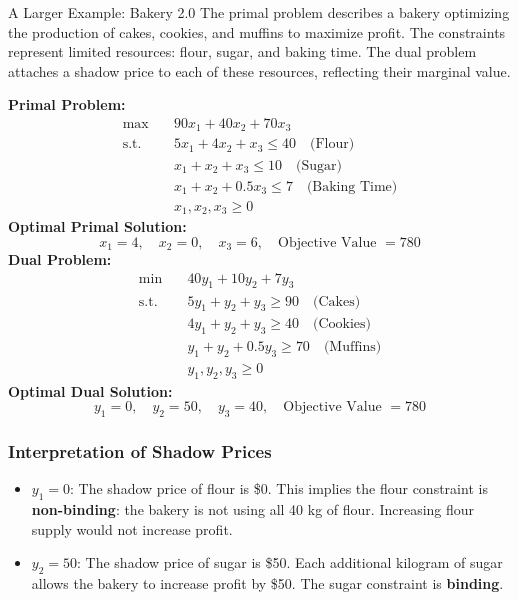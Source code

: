 \begin{example}{A Larger Example: Bakery 2.0}{}
The primal problem describes a bakery optimizing the production of cakes, cookies, and muffins to maximize profit. The constraints represent limited resources: flour, sugar, and baking time. The dual problem attaches a shadow price to each of these resources, reflecting their marginal value.

\vspace{1em}
\noindent\textbf{Primal Problem:}
$$
\begin{aligned}
\max\quad & 90x_1 + 40x_2 + 70x_3 \\
\text{s.t.} \quad
& 5x_1 + 4x_2 + x_3 \leq 40 \quad \text{(Flour)} \\
& x_1 + x_2 + x_3 \leq 10 \quad \text{(Sugar)} \\
& x_1 + x_2 + 0.5x_3 \leq 7 \quad \text{(Baking Time)} \\
& x_1, x_2, x_3 \geq 0
\end{aligned}
$$
\textbf{Optimal Primal Solution:}
$$
x_1 = 4,\quad x_2 = 0,\quad x_3 = 6,\quad \text{Objective Value } = 780
$$
\vspace{1em}
\noindent\textbf{Dual Problem:}
$$
\begin{aligned}
\min\quad & 40y_1 + 10y_2 + 7y_3 \\
\text{s.t.} \quad
& 5y_1 + y_2 + y_3 \geq 90 \quad \text{(Cakes)} \\
& 4y_1 + y_2 + y_3 \geq 40 \quad \text{(Cookies)} \\
& y_1 + y_2 + 0.5y_3 \geq 70 \quad \text{(Muffins)} \\
& y_1, y_2, y_3 \geq 0
\end{aligned}
$$
\textbf{Optimal Dual Solution:}
$$
y_1 = 0,\quad y_2 = 50,\quad y_3 = 40,\quad \text{Objective Value } = 780
$$

\vspace{1em}
\subsubsection*{Interpretation of Shadow Prices}
\begin{itemize}
\item $y_1 = 0$: The shadow price of flour is \$0.
This implies the flour constraint is \textbf{non-binding}: the bakery is not using all 40 kg of flour. Increasing flour supply would not increase profit.

\item $y_2 = 50$: The shadow price of sugar is \$50.
Each additional kilogram of sugar allows the bakery to increase profit by \$50. The sugar constraint is \textbf{binding}.


\end{itemize}
\end{example}

